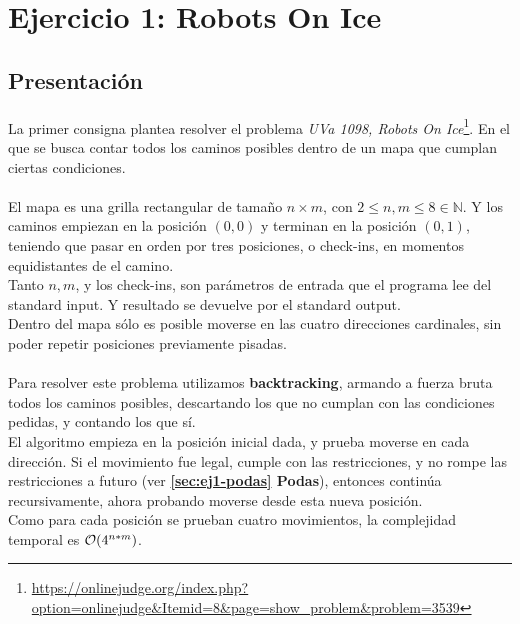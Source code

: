 \documentclass[./main.tex]{subfiles}
\begin{document}
\section{Ejercicio 1: Robots On Ice}
\label{sec:ej1}

\subsection{Presentación}
\label{sec:ej1-intro}

\paragraph{} La primer consigna plantea resolver el problema \textit{UVa 1098, Robots On Ice}\footnote{\url{https://onlinejudge.org/index.php?option=onlinejudge&Itemid=8&page=show_problem&problem=3539}}. En el que se busca contar todos los caminos posibles dentro de un mapa que cumplan ciertas condiciones.

\paragraph{} El mapa es una grilla rectangular de tamaño \(n \times m\), con \(2 \leq n, m \leq 8 \in \mathbb{N}\). Y los caminos empiezan en la posición \((0, 0)\) y terminan en la posición \((0, 1)\), teniendo que pasar en orden por tres posiciones, o check-ins, en momentos equidistantes de el camino. \\
Tanto \(n, m\), y los check-ins, son parámetros de entrada que el programa lee del standard input. Y resultado se devuelve por el standard output. \\
\indent Dentro del mapa sólo es posible moverse en las cuatro direcciones cardinales, sin poder repetir posiciones previamente pisadas.

\paragraph{} Para resolver este problema utilizamos \textbf{backtracking}, armando a fuerza bruta todos los caminos posibles, descartando los que no cumplan con las condiciones pedidas, y contando los que sí. \\
\indent El algoritmo empieza en la posición inicial dada, y prueba moverse en cada dirección. Si el movimiento fue legal, cumple con las restricciones, y no rompe las restricciones a futuro (ver \textbf{\ref{sec:ej1-podas} Podas}), entonces continúa recursivamente, ahora probando moverse desde esta nueva posición. \\
\indent Como para cada posición se prueban cuatro movimientos, la complejidad temporal es \(\mathcal{O}(4^{n*m})\).
\end{document}
